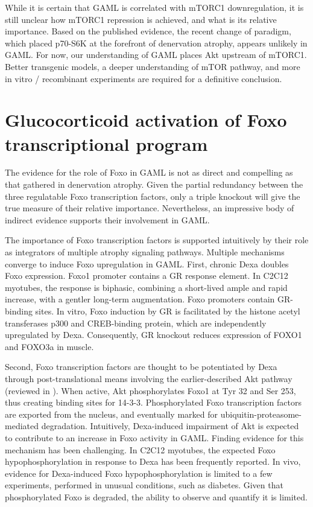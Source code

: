\documentclass[12pt,english]{report}\usepackage[]{graphicx}\usepackage[]{color}
\begin{document}
While it is certain that GAML is correlated with mTORC1 downregulation,
it is still unclear how mTORC1 repression is achieved, and what is
its relative importance. Based on the published evidence, the recent
change of paradigm, which placed p70-S6K at the forefront of denervation
atrophy, appears unlikely in GAML. For now, our understanding of GAML
places Akt upstream of mTORC1. Better transgenic models, a deeper
understanding of mTOR pathway, and more in vitro / recombinant experiments
are required for a definitive conclusion.


\section{Glucocorticoid activation of Foxo transcriptional program}

The evidence for the role of Foxo in GAML is not as direct and compelling
as that gathered in denervation atrophy. Given the partial redundancy
between the three regulatable Foxo transcription factors, only a triple
knockout will give the true measure of their relative importance.
Nevertheless, an impressive body of indirect evidence supports their
involvement in GAML.

The importance of Foxo transcription factors is supported intuitively
by their role as integrators of multiple atrophy signaling pathways.
Multiple mechanisms converge to induce Foxo upregulation in GAML.
First, chronic Dexa doubles Foxo expression\citep{wu2010redd1}. Foxo1
promoter contains a GR response element\citep{qin2014identification}.
In C2C12 myotubes, the response is biphasic, combining a short-lived
ample and rapid increase, with a gentler long-term augmentation\citep{nishimura2008effects}.
Foxo promoters contain GR-binding sites\citep{lutzner2012foxo3}.
In vitro, Foxo induction by GR is facilitated by the histone acetyl
transferases p300 and CREB-binding protein, which are independently
upregulated by Dexa\citep{alamdari2010sepsis}. Consequently, GR knockout
reduces expression of FOXO1 and FOXO3a in muscle\citep{waddell2008glucocorticoid}.

Second, Foxo transcription factors are thought to be potentiated by
Dexa through post-translational means involving the earlier-described
Akt pathway (reviewed in \citep{calnan2008foxo}). When active, Akt
phosphorylates Foxo1 at Tyr 32 and Ser 253, thus creating binding
sites for 14-3-3. Phosphorylated Foxo transcription factors are exported
from the nucleus, and eventually marked for ubiquitin-proteasome-mediated
degradation. Intuitively, Dexa-induced impairment of Akt is expected
to contribute to an increase in Foxo activity in GAML. Finding evidence
for this mechanism has been challenging. In C2C12 myotubes, the expected
Foxo hypophosphorylation in response to Dexa has been frequently reported\citep{zhao2007foxo3,sandri2004foxo}.
In vivo, evidence for Dexa-induced Foxo hypophosphorylation is limited
to a few experiments, performed in unusual conditions, such as diabetes\citep{jones2010effects,fappi2014effects,jesinkey2014atomoxetine}.
Given that phosphorylated Foxo is degraded, the ability to observe
and quantify it is limited.
\end{document}
